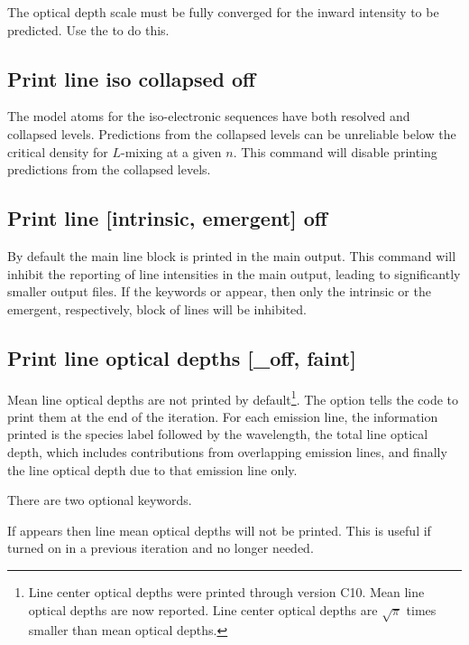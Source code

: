 The optical depth scale must be fully converged for the inward
intensity to be predicted.
Use the  to do this.

\subsection{Print line iso collapsed off}
\label{sec:CommandPrintLineIsoCollapsed}

The model atoms for the iso-electronic sequences have both resolved and
collapsed levels.
Predictions from the collapsed levels can be unreliable 
below the critical density for $L$-mixing at a given $n$.
This command will disable printing predictions from the collapsed
levels.

\subsection{Print line [intrinsic, emergent] off}

By default the main line block is printed in the main output.
This command will inhibit the reporting of line intensities in
the main output, leading to significantly smaller output files.
If the keywords  or 
appear, then only the intrinsic or the emergent, respectively,
block of lines will be inhibited.

\subsection{Print line optical depths [\_off, faint]}
\label{sec:PrintLineOptDep}

Mean line optical depths are not printed by default\footnote{Line center optical
depths were printed through version C10.  Mean line optical depths
are now reported.  Line center optical depths are 
$\sqrt{ \pi}$  times smaller than mean optical depths.}.
The option tells the
code to print them at the end of the iteration.
For each emission line, the information printed is the species
label followed by the wavelength, the total line optical depth,
which includes contributions from overlapping emission lines,
and finally the line optical depth due to that emission line
only.

There are two optional
keywords.

If  appears then line mean optical depths will not be printed.  This is
useful if turned on in a previous iteration and no longer needed.

